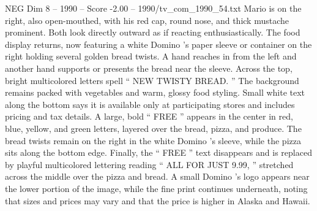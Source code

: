 \begin{textsample}{NEG Dim 8 – 1990 – Score -2.00 – 1990/tv\_com\_1990\_54.txt}
Mario is on the right, also open-mouthed, with his red cap, round nose, and thick mustache prominent.
Both look directly outward as if reacting enthusiastically.
The food display returns, now featuring a white Domino ’s paper sleeve or container on the right holding several golden bread twists.
A hand reaches in from the left and another hand supports or presents the bread near the sleeve.
Across the top, bright multicolored letters spell “ NEW TWISTY BREAD. ” The background remains packed with vegetables and warm, glossy food styling.
Small white text along the bottom says it is available only at participating stores and includes pricing and tax details.
A large, bold “ FREE ” appears in the center in red, blue, yellow, and green letters, layered over the bread, pizza, and produce.
The bread twists remain on the right in the white Domino ’s sleeve, while the pizza sits along the bottom edge.
Finally, the “ FREE ” text disappears and is replaced by playful multicolored lettering reading “ ALL FOR JUST 9.99, ” stretched across the middle over the pizza and bread.
A small Domino ’s logo appears near the lower portion of the image, while the fine print continues underneath, noting that sizes and prices may vary and that the price is higher in Alaska and Hawaii.

\end{textsample}
